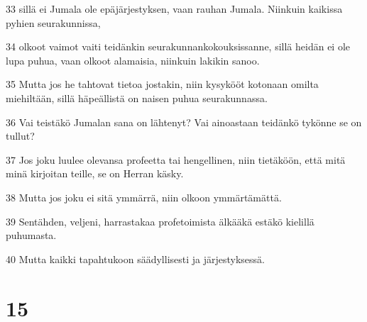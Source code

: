 \par 33 sillä ei Jumala ole epäjärjestyksen, vaan rauhan Jumala. Niinkuin kaikissa pyhien seurakunnissa,
\par 34 olkoot vaimot vaiti teidänkin seurakunnankokouksissanne, sillä heidän ei ole lupa puhua, vaan olkoot alamaisia, niinkuin lakikin sanoo.
\par 35 Mutta jos he tahtovat tietoa jostakin, niin kysykööt kotonaan omilta miehiltään, sillä häpeällistä on naisen puhua seurakunnassa.
\par 36 Vai teistäkö Jumalan sana on lähtenyt? Vai ainoastaan teidänkö tykönne se on tullut?
\par 37 Jos joku luulee olevansa profeetta tai hengellinen, niin tietäköön, että mitä minä kirjoitan teille, se on Herran käsky.
\par 38 Mutta jos joku ei sitä ymmärrä, niin olkoon ymmärtämättä.
\par 39 Sentähden, veljeni, harrastakaa profetoimista älkääkä estäkö kielillä puhumasta.
\par 40 Mutta kaikki tapahtukoon säädyllisesti ja järjestyksessä.

\chapter{15}

